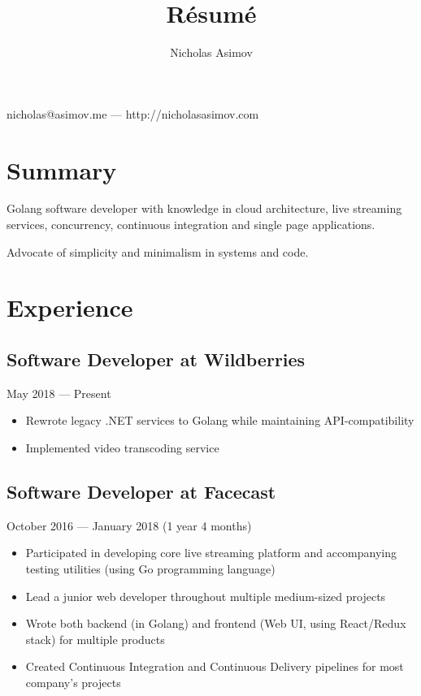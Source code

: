 \documentclass[a4paper,11pt]{article}
\makeatletter
\renewcommand{\maketitle}{
    \begin{center}
        {
            \huge
            \bfseries
            \theauthor
        }
 
        \vspace{.25em}
        nicholas@asimov.me --- http://nicholasasimov.com
    \end{center}
}
\makeatother
\begin{document}
\title{R\'esum\'e}
\author{Nicholas Asimov}

\maketitle

\section{Summary}

Golang software developer with knowledge in cloud architecture, live streaming services, concurrency,
continuous integration and single page applications.
\newline

\noindent
Advocate of simplicity and minimalism in systems and code.

\section{Experience}

\subsection{Software Developer at Wildberries}
May 2018 --- Present
\begin{itemize}[noitemsep]
    \renewcommand{\labelitemi}{---}

    \item Rewrote legacy .NET services to Golang while maintaining API-compatibility
    \item Implemented video transcoding service
\end{itemize}

\subsection{Software Developer at Facecast}
October 2016 --- January 2018 (1 year 4 months)
\begin{itemize}[noitemsep]
    \renewcommand{\labelitemi}{---}

    \item Participated in developing core live streaming platform and accompanying testing utilities (using Go programming language)
    \item Lead a junior web developer throughout multiple medium-sized projects
    \item Wrote both backend (in Golang) and frontend (Web UI, using React/Redux stack) for multiple products
    \item Created Continuous Integration and Continuous Delivery pipelines for most company's projects
\end{itemize}
\end{document}
